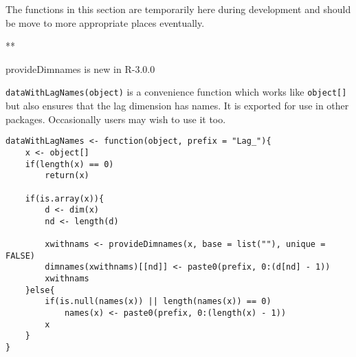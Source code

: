 \documentclass[11pt,a4paper]{article}
\begin{document}
The functions in this section are temporarily here during development and should be move to
more appropriate places eventually.

**

provideDimnames is new in R-3.0.0

\texttt{dataWithLagNames(object)} is a convenience function which works like
\texttt{object[]} but also ensures that the lag dimension has names. It is exported for use in other
packages. Occasionally users may wish to use it too.
\begin{verbatim}
dataWithLagNames <- function(object, prefix = "Lag_"){
    x <- object[]
    if(length(x) == 0)
        return(x)

    if(is.array(x)){
        d <- dim(x)
        nd <- length(d)

        xwithnams <- provideDimnames(x, base = list(""), unique = FALSE)
        dimnames(xwithnams)[[nd]] <- paste0(prefix, 0:(d[nd] - 1))
        xwithnams
    }else{
        if(is.null(names(x)) || length(names(x)) == 0)
            names(x) <- paste0(prefix, 0:(length(x) - 1))
        x
    }
}
\end{verbatim}
\end{document}
